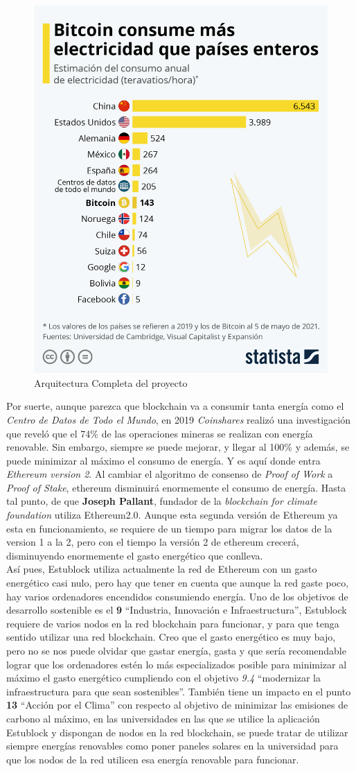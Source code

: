 \begin{figure}[h!]
  \centering
  \includegraphics[width=0.4\linewidth]{figs/ImpactoMedioAmbiente/electricidad_bitcoin}
  \caption[Arquitectura]{Arquitectura Completa del proyecto}
  \label{fig:estublockArch}
\end{figure}

\clearpage
Por suerte, aunque parezca que blockchain va a consumir tanta energía como el \textit{Centro de Datos de Todo el Mundo}, en 2019 \emph{Coinshares} realizó una investigación\cite{coinshare} que reveló que el 74\% de las operaciones mineras se realizan con energía renovable. Sin embargo, siempre se puede mejorar, y llegar al 100\% y además, se puede minimizar al máximo el consumo de energía. Y es aquí donde entra \emph{Ethereum version 2}\cite{Ethereum2.0}. Al cambiar el algoritmo de consenso de \textit{Proof of Work} a \textit{Proof of Stake}, ethereum disminuirá enormemente el consumo de energía. Hasta tal punto, de que \textbf{Joseph Pallant}, fundador de la \emph{blockchain for climate foundation}\cite{bkClimateF} utiliza Ethereum2.0. Aunque esta segunda versión de Ethereum ya esta en funcionamiento, se requiere de un tiempo para migrar los datos de la version 1 a la 2, pero con el tiempo la versión 2 de ethereum crecerá, disminuyendo enormemente el gasto energético que conlleva. \\

Así pues, Estublock utiliza actualmente la red de Ethereum con un gasto energético casi nulo, pero hay que tener en cuenta que aunque la red gaste poco, hay varios ordenadores encendidos consumiendo energía. Uno de los objetivos de desarrollo sostenible es el \textbf{9} ``Industria, Innovación e Infraestructura'', Estublock requiere de varios nodos en la red blockchain para funcionar, y para que tenga sentido utilizar una red blockchain. Creo que el gasto energético es muy bajo, pero no se nos puede olvidar que gastar energía, gasta y que sería recomendable lograr que los ordenadores estén lo más especializados posible para minimizar al máximo el gasto energético cumpliendo con el objetivo \textit{9.4} ``modernizar la infraestructura para que sean sostenibles''. También tiene un impacto en el punto \textbf{13} ``Acción por el Clima'' con respecto al objetivo de minimizar las emisiones de carbono al máximo, en las universidades en las que se utilice la aplicación Estublock y dispongan de nodos en la red blockchain, se puede tratar de utilizar siempre energías renovables como poner paneles solares en la universidad para que los nodos de la red utilicen esa energía renovable para funcionar.

